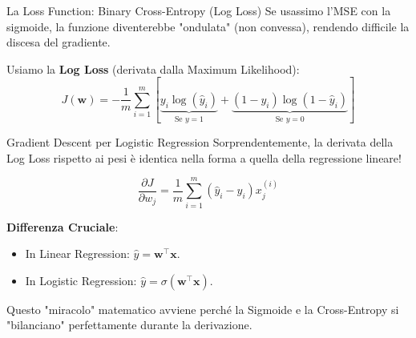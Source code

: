 \documentclass[aspectratio=169, 10pt]{beamer}
\begin{document}
\begin{frame}{La Loss Function: Binary Cross-Entropy (Log Loss)}
    Se usassimo l'MSE con la sigmoide, la funzione diventerebbe "ondulata" (non convessa), rendendo difficile la discesa del gradiente.
    
    Usiamo la \textbf{Log Loss} (derivata dalla Maximum Likelihood):
    \[ J(\mathbf{w}) = - \frac{1}{m} \sum_{i=1}^m \left[ \underbrace{y_i \log(\hat{y}_i)}_{\text{Se } y=1} + \underbrace{(1-y_i) \log(1-\hat{y}_i)}_{\text{Se } y=0} \right] \]
    
    \centering
\end{frame}

\begin{frame}{Gradient Descent per Logistic Regression}
    Sorprendentemente, la derivata della Log Loss rispetto ai pesi è identica nella forma a quella della regressione lineare!
    
    \[ \frac{\partial J}{\partial w_j} = \frac{1}{m} \sum_{i=1}^m (\hat{y}_i - y_i) x_j^{(i)} \]
    
    \textbf{Differenza Cruciale}:
    \begin{itemize}
        \item In Linear Regression: $\hat{y} = \mathbf{w}^\top \mathbf{x}$.
        \item In Logistic Regression: $\hat{y} = \sigma(\mathbf{w}^\top \mathbf{x})$.
    \end{itemize}
    
    \small Questo "miracolo" matematico avviene perché la Sigmoide e la Cross-Entropy si "bilanciano" perfettamente durante la derivazione.
\end{frame}
\end{document}
